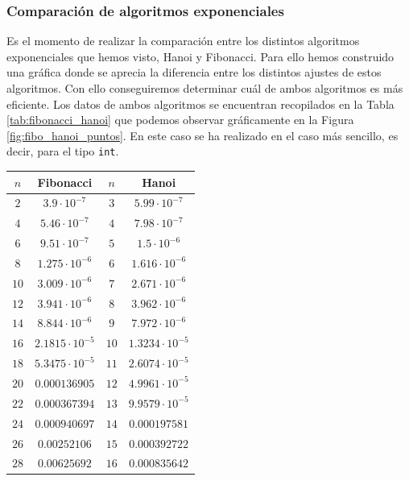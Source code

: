 \documentclass[12pt]{article}
\begin{document}
    \subsubsection{Comparación de algoritmos exponenciales}

    Es el momento de realizar la comparación entre los distintos algoritmos exponenciales que hemos visto, Hanoi y Fibonacci. Para ello hemos construido una gráfica donde se aprecia la diferencia entre los distintos ajustes de estos algoritmos. Con ello conseguiremos determinar cuál de ambos algoritmos es más eficiente. Los datos de ambos algoritmos se encuentran recopilados en la Tabla \ref{tab:fibonacci_hanoi} que podemos observar gráficamente en la Figura \ref{fig:fibo_hanoi_puntos}. En este caso se ha realizado en el caso más sencillo, es decir, para el tipo \verb|int|.
    \begin{table}
        \centering
        \begin{tabular}{|c|c||c|c|}
            \hline
            $n$ & Fibonacci & $n$ & Hanoi \\
            \hline
            $2$  & $3.9\cdot 10^{-7}$ & $3$  & $5.99\cdot 10^{-7}$ \\
            $4$  & $5.46\cdot 10^{-7}$ & $4$  & $7.98\cdot 10^{-7}$ \\
            $6$  & $9.51\cdot 10^{-7}$ & $5$  & $1.5\cdot 10^{-6}$ \\
            $8$  & $1.275\cdot 10^{-6}$ & $6$  & $1.616\cdot 10^{-6}$ \\
            $10$ & $3.009\cdot 10^{-6}$ & $7$  & $2.671\cdot 10^{-6}$ \\
            $12$ & $3.941\cdot 10^{-6}$ & $8$  & $3.962\cdot 10^{-6}$ \\
            $14$ & $8.844\cdot 10^{-6}$ & $9$  & $7.972\cdot 10^{-6}$ \\
            $16$ & $2.1815\cdot 10^{-5}$ & $10$ & $1.3234\cdot 10^{-5}$ \\
            $18$ & $5.3475\cdot 10^{-5}$ & $11$ & $2.6074\cdot 10^{-5}$ \\
            $20$ & $0.000136905$ & $12$ & $4.9961\cdot 10^{-5}$ \\
            $22$ & $0.000367394$ & $13$ & $9.9579\cdot 10^{-5}$ \\
            $24$ & $0.000940697$ & $14$ & $0.000197581$ \\
            $26$ & $0.00252106$ & $15$ & $0.000392722$ \\
            $28$ & $0.00625692$ & $16$ & $0.000835642$ \\

\end{tabular}
\end{table}
\end{document}
